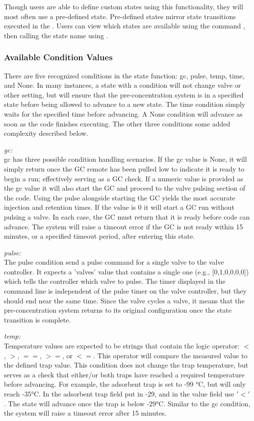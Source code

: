 Though users are able to define custom states using this functionality, they will most often use a pre-defined state. Pre-defined states mirror state transitions executed in the . Users can view which states are available using the command , then calling the state name using .

\subsubsection{Available Condition Values}
There are five recognized conditions in the state function: gc, pulse, temp, time, and None. In many instances, a state with a condition will not change valve or other setting, but will ensure that the pre-concentration system is in a specified state before being allowed to advance to a new state. The time condition simply waits for the specified time before advancing. A None condition will advance as soon as the code finishes executing. The other three conditions some added complexity described below.

\emph{gc:}\\
gc has three possible condition handling scenarios. If the gc value is None, it will simply return once the GC remote has been pulled low to indicate it is ready to begin a run; effectively serving as a GC check. If a numeric value is provided as the gc value it will also start the GC and proceed to the valve pulsing section of the code. Using the pulse alongside starting the GC yields the most accurate injection and retention times. If the value is 0 it will start a GC run without pulsing a valve. In each case, the GC must return that it is ready before code can advance. The system will raise a timeout error if the GC is not ready within 15 minutes, or a specified timeout period, after entering this state.

\emph{pulse:}\\
The pulse condition send a pulse command for a single valve to the valve controller. It expects a 'valves' value that contains a single one (e.g., [0,1,0,0,0,0]) which tells the controller which valve to pulse. The timer displayed in the command line is independent of the pulse timer on the valve controller, but they should end near the same time. Since the valve cycles a valve, it means that the pre-concentration system returns to its original configuration once the state transition is complete.

\emph{temp:}\\
Temperature values are expected to be strings that contain the logic operator: $<$, $>$, $==$, $>=$, or $<=$. This operator will compare the measured value to the defined trap value. This condition does not change the trap temperature, but serves as a check that either/or both traps have reached a required temperature before advancing. For example, the adsorbent trap is set to -99 °C, but will only reach -35°C. In the adsorbent trap field put in -29, and in the value field use $'<'$. The state will advance once the trap is below -29°C. Similar to the gc condition, the system will raise a timeout error after 15 minutes.


